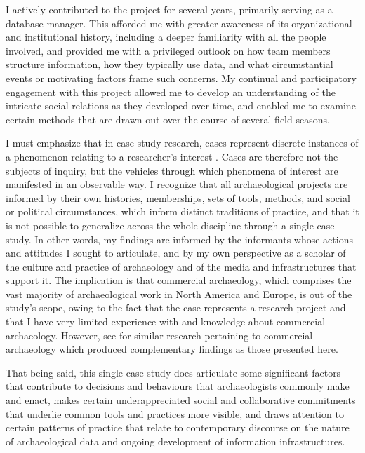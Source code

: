\documentclass{article}
\begin{document}
I actively contributed to the project for several years, primarily
serving as a database manager. This afforded me with greater awareness
of its organizational and institutional history, including a deeper
familiarity with all the people involved, and provided me with a
privileged outlook on how team members structure information, how they
typically use data, and what circumstantial events or motivating factors
frame such concerns. My continual and participatory engagement with this
project allowed me to develop an understanding of the intricate social
relations as they developed over time, and enabled me to examine certain
methods that are drawn out over the course of several field seasons.

I must emphasize that in case-study research, cases represent discrete
instances of a phenomenon relating to a researcher's interest
\parencite{ragin1992}. Cases are therefore not the subjects of inquiry,
but the vehicles through which phenomena of interest are manifested in
an observable way. I recognize that all archaeological projects are
informed by their own histories, memberships, sets of tools, methods,
and social or political circumstances, which inform distinct traditions
of practice, and that it is not possible to generalize across the whole
discipline through a single case study. In other words, my findings are
informed by the informants whose actions and attitudes I sought to
articulate, and by my own perspective as a scholar of the culture and
practice of archaeology and of the media and infrastructures that
support it. The implication is that commercial archaeology, which
comprises the vast majority of archaeological work in North America and
Europe, is out of the study's scope, owing to the fact that the case
represents a research project and that I have very limited experience
with and knowledge about commercial archaeology. However, see
\textcites{chadwick1998}{thorpe2012}{zorzin2015}
for similar research pertaining to commercial archaeology which produced
complementary findings as those presented here.

That being said, this single case study does articulate some significant
factors that contribute to decisions and behaviours that archaeologists
commonly make and enact, makes certain underappreciated social and
collaborative commitments that underlie common tools and practices more
visible, and draws attention to certain patterns of practice that relate
to contemporary discourse on the nature of archaeological data and
ongoing development of information infrastructures.
\end{document}
